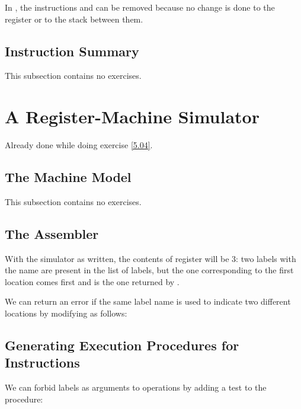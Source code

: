 \begin{exe}[5.6]
    In , the instructions  and 
     can be removed because no change is done to the 
     register or to the stack between them.
\end{exe}

\subsection{Instruction Summary}

This subsection contains no exercises.

\section{A Register-Machine Simulator}

\begin{exe}[5.7]
    Already done while doing exercise \ref{5.04}.
\end{exe}

\subsection{The Machine Model}

This subsection contains no exercises.

\subsection{The Assembler}

\begin{exe}[5.8]
    With the simulator as written, the contents of register  will be 3: 
    two labels with the name  are present in the list of labels, but 
    the one corresponding to the first location comes first and is the one 
    returned by .

    We can return an error if the same label name is used to indicate two 
    different locations by modifying  as follows:
\end{exe}

\subsection{Generating Execution Procedures for Instructions}

\begin{exe}[5.9]
    We can forbid labels as arguments to operations by adding a test to the 
     procedure:
\end{exe}

